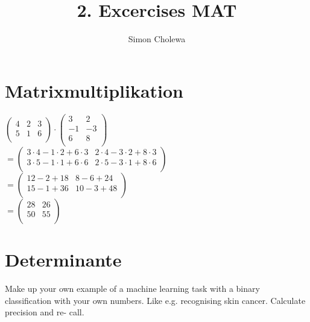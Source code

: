 \documentclass[11pt,a4paper]{article}
\title{}
\author{}
\begin{document}
\author{Simon Cholewa}
\title{2. Excercises MAT}

\maketitle

\section{Matrixmultiplikation}
$
\left( 
	\begin{array}{rrr}
		4 & 2 & 3 \\
		5 & 1 & 6 \\
	\end{array}
 \right)
 \cdot
 \left(
	\begin{array}{rr}
		3 & 2 \\
		-1 & -3 \\
		6 & 8\\
	\end{array}
\right)$\\
$
=
\left(
	\begin{array}{cc}
		3\cdot4 - 1\cdot2 + 6\cdot3 & 2\cdot4 - 3\cdot2 + 8\cdot3 \\
		3\cdot5 - 1\cdot1 + 6\cdot6 & 2\cdot5 - 3\cdot1 + 8\cdot6 \\
	\end{array}
\right)$\\
$
=
\left(
	\begin{array}{cc}
		12-2+18 & 8-6+24 \\
		15-1+36 & 10-3+48\\
	\end{array}
\right)$\\
$
=
\left(
	\begin{array}{cc}
		28 & 26 \\
		50 & 55 \\
	\end{array}
\right)
$

\section{Determinante}
Make up your own example of a machine learning task with a binary classification
with your own numbers. Like e.g. recognising skin cancer. Calculate precision and re-
call.
\end{document}

